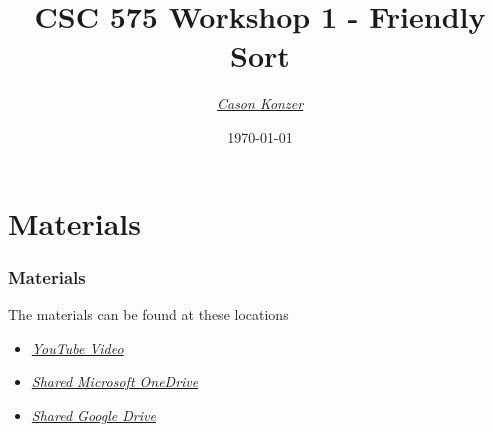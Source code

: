 \documentclass{beamer}
\title[Workshop 1]{CSC 575 Workshop 1 - Friendly Sort}
\author{\XV\textit{\large{\href{https://github.com/casonk}{Cason Konzer}}}\XB}
\institute[UM FLINT]{\normalsize{\textit{\href{mailto:casonk@umich.edu}{casonk@umich.edu}}}}
\date[]{\today}
\newcommand{\XB}{\color{black}}
\newcommand{\XV}{\color{violet}}
\begin{document}
\begin{frame}
    \titlepage
\end{frame}




\section{Materials}

\begin{frame}

    \frametitle{Materials}

    The materials can be found at these locations 

    \vspace{2.5mm}
    \begin{itemize}
        \item \XV\textit{\large{\href{https://youtube.com}{YouTube Video}}}\XB
        \item \XV\textit{\large{\href{https://umich-my.sharepoint.com/:f:/g/personal/casonk_umich_edu/EtqLFGQpc6REmjXmrwATvgsBm2_5YP5BmIwHlNsdCIsSkw?e=wKOc47}{Shared Microsoft OneDrive}}}\XB
        \item \XV\textit{\large{\href{https://drive.google.com/drive/folders/1jGFwkrPJtFuzBKKYkiXPAQZEeKZ2S8tR?usp=sharing}{Shared Google Drive}}}\XB
    \end{itemize}

\end{frame}
\end{document}
